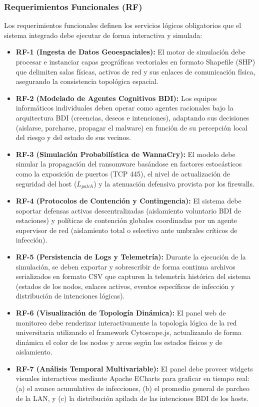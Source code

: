 \subsubsection{Requerimientos Funcionales (RF)}
Los requerimientos funcionales definen los servicios lógicos obligatorios que el sistema integrado debe ejecutar de forma interactiva y simulada:
\begin{itemize}
    \item \textbf{RF-1 (Ingesta de Datos Geoespaciales):} El motor de simulación debe procesar e instanciar capas geográficas vectoriales en formato Shapefile (SHP) que delimiten salas físicas, activos de red y sus enlaces de comunicación física, asegurando la consistencia topológica espacial.
    \item \textbf{RF-2 (Modelado de Agentes Cognitivos BDI):} Los equipos informáticos individuales deben operar como agentes racionales bajo la arquitectura BDI (creencias, deseos e intenciones), adaptando sus decisiones (aislarse, parcharse, propagar el malware) en función de su percepción local del riesgo y del estado de sus vecinos.
    \item \textbf{RF-3 (Simulación Probabilística de WannaCry):} El modelo debe simular la propagación del ransomware basándose en factores estocásticos como la exposición de puertos (TCP 445), el nivel de actualización de seguridad del host ($L_{patch}$) y la atenuación defensiva provista por los firewalls.
    \item \textbf{RF-4 (Protocolos de Contención y Contingencia):} El sistema debe soportar defensas activas descentralizadas (aislamiento voluntario BDI de estaciones) y políticas de contención globales coordinadas por un agente supervisor de red (aislamiento total o selectivo ante umbrales críticos de infección).
    \item \textbf{RF-5 (Persistencia de Logs y Telemetría):} Durante la ejecución de la simulación, se deben exportar y sobrescribir de forma continua archivos serializados en formato CSV que capturen la telemetría histórica del sistema (estados de los nodos, enlaces activos, eventos específicos de infección y distribución de intenciones lógicas).
    \item \textbf{RF-6 (Visualización de Topología Dinámica):} El panel web de monitoreo debe renderizar interactivamente la topología lógica de la red universitaria utilizando el framework Cytoscape.js, actualizando de forma dinámica el color de los nodos y arcos según los estados físicos y de aislamiento.
    \item \textbf{RF-7 (Análisis Temporal Multivariable):} El panel debe proveer widgets visuales interactivos mediante Apache ECharts para graficar en tiempo real: (a) el avance acumulativo de infecciones, (b) el promedio general de parcheo de la LAN, y (c) la distribución apilada de las intenciones BDI de los hosts.
\end{itemize}

